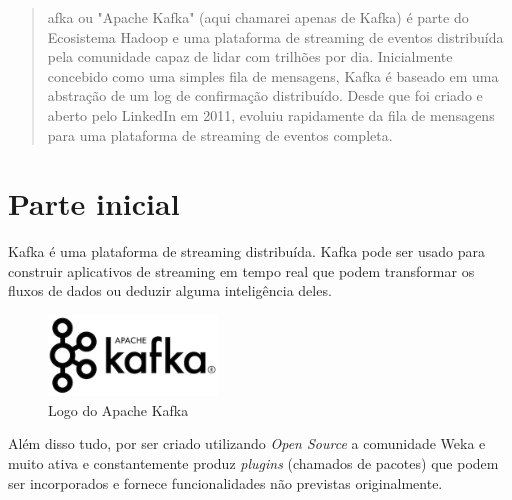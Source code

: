 \documentclass[a4paper,11pt]{article}
\begin{document}
	
	\maketitle %
	\thispagestyle{fancy} %
	
\begin{abstract}
	afka\cite{kafkaoficial} ou "Apache Kafka" (aqui chamarei apenas de Kafka) é parte do Ecosistema Hadoop e uma plataforma de streaming de eventos distribuída pela comunidade capaz de lidar com trilhões por dia. Inicialmente concebido como uma simples fila de mensagens, Kafka é baseado em uma abstração de um log de confirmação distribuído. Desde que foi criado e aberto pelo LinkedIn em 2011, evoluiu rapidamente da fila de mensagens para uma plataforma de streaming de eventos completa.
\end{abstract}

\section{Parte inicial}
Kafka é uma plataforma de streaming distribuída. Kafka pode ser usado para construir aplicativos de streaming em tempo real que podem transformar os fluxos de dados ou deduzir alguma inteligência deles. 

\begin{figure}[H]
	\centering
	\includegraphics[width=0.4\textwidth]{imagem/logo}
	\caption{Logo do Apache Kafka}
\end{figure}

Além disso tudo, por ser criado utilizando \textit{Open Source} a comunidade Weka e muito ativa e constantemente produz \textit{plugins} (chamados de pacotes) que podem ser incorporados e fornece funcionalidades não previstas originalmente.
\end{document}
